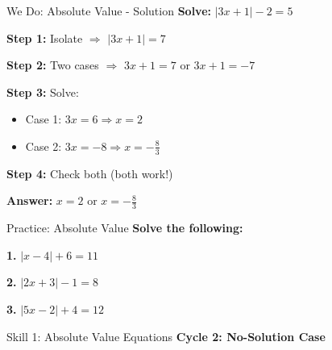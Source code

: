 \documentclass[12pt]{beamer}
\begin{document}
\begin{frame}{We Do: Absolute Value - Solution}
\textbf{Solve:} $|3x + 1| - 2 = 5$

\pause
\vspace{0.3cm}

\textbf{Step 1:} Isolate \pause $\Rightarrow$ $|3x + 1| = 7$

\pause
\vspace{0.3cm}

\textbf{Step 2:} Two cases \pause $\Rightarrow$ $3x + 1 = 7$ or $3x + 1 = -7$

\pause
\vspace{0.3cm}

\textbf{Step 3:} Solve:

\pause
\begin{itemize}
\item Case 1: $3x = 6 \Rightarrow x = 2$ \pause
\item Case 2: $3x = -8 \Rightarrow x = -\displaystyle\frac{8}{3}$
\end{itemize}

\pause
\vspace{0.3cm}

\textbf{Step 4:} Check both (both work!) \checkmark

\pause
\vspace{0.3cm}

\textbf{Answer:} $x = 2$ or $x = -\displaystyle\frac{8}{3}$
\end{frame}

\begin{frame}{Practice: Absolute Value}
\textbf{Solve the following:}

\vspace{0.5cm}

\textbf{1.} $|x - 4| + 6 = 11$ 

\vspace{0.5cm}

\textbf{2.} $|2x + 3| - 1 = 8$ 

\vspace{0.5cm}

\textbf{3.} $|5x - 2| + 4 = 12$ 
\end{frame}

\begin{frame}{Skill 1: Absolute Value Equations}
\Large
\textbf{Cycle 2: No-Solution Case}
\end{frame}
\end{document}
